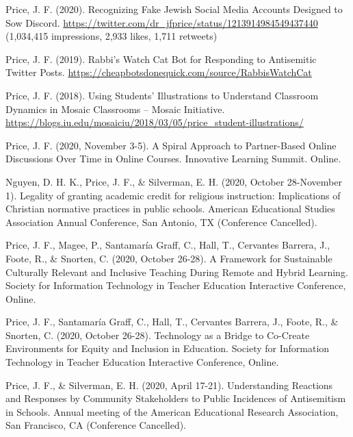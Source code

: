\documentclass[11pt,article,oneside]{memoir}
\begin{document}
\ind Price, J. F. (2020). Recognizing Fake Jewish Social Media Accounts Designed to Sow Discord. \href{https://twitter.com/dr\_jfprice/status/1213914984549437440}{https://twitter.com/dr\_jfprice/status/1213914984549437440} (1,034,415 impressions, 2,933 likes, 1,711 retweets)

\ind Price, J. F. (2019). Rabbi's Watch Cat Bot for Responding to Antisemitic Twitter Posts. \href{https://cheapbotsdonequick.com/source/RabbisWatchCat}{https://cheapbotsdonequick.com/source/RabbisWatchCat}

\ind Price, J. F. (2018). Using Students’ Illustrations to Understand Classroom Dynamics in Mosaic Classrooms – Mosaic Initiative. \href{https://blogs.iu.edu/mosaiciu/2018/03/05/price\_student-illustrations/}{https://blogs.iu.edu/\newline mosaiciu/2018/03/05/price\_student-illustrations/}


\newpage




\ind Price, J. F. (2020, November 3-5). A Spiral Approach to Partner-Based Online Discussions Over Time in Online Courses. Innovative Learning Summit. Online.

\ind Nguyen, D. H. K., Price, J. F., \& Silverman, E. H. (2020, October 28-November 1). Legality of granting academic credit for religious instruction: Implications of Christian normative practices in public schools. American Educational Studies Association Annual Conference, San Antonio, TX (Conference Cancelled).

\ind Price, J. F., Magee, P., Santamaría Graff, C., Hall, T., Cervantes Barrera, J., Foote, R., \& Snorten, C. (2020, October 26-28). A Framework for Sustainable Culturally Relevant and Inclusive Teaching During Remote and Hybrid Learning. Society for Information Technology in Teacher Education Interactive Conference, Online.

\ind Price, J. F., Santamaría Graff, C., Hall, T., Cervantes Barrera, J., Foote, R., \& Snorten, C. (2020, October 26-28). Technology as a Bridge to Co-Create Environments for Equity and Inclusion in Education. Society for Information Technology in Teacher Education Interactive Conference, Online.

\ind Price, J. F., \& Silverman, E. H. (2020, April 17-21). Understanding Reactions and Responses by Community Stakeholders to Public Incidences of Antisemitism in Schools. Annual meeting of the American Educational Research Association, San Francisco, CA (Conference Cancelled).
\end{document}
